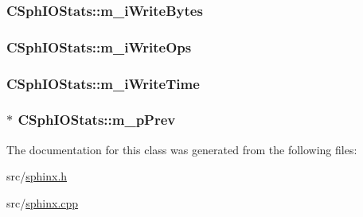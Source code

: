 \hypertarget{classCSphIOStats_a392b3667765a3b3329bb8e3673a192e1}{
\subsubsection[{m\-\_\-i\-Write\-Bytes}]{ C\-Sph\-I\-O\-Stats\-::m\-\_\-i\-Write\-Bytes}}\label{classCSphIOStats_a392b3667765a3b3329bb8e3673a192e1}
\hypertarget{classCSphIOStats_a96e6898d2120e25d31a5fe8bb86864f7}{
\subsubsection[{m\-\_\-i\-Write\-Ops}]{ C\-Sph\-I\-O\-Stats\-::m\-\_\-i\-Write\-Ops}}\label{classCSphIOStats_a96e6898d2120e25d31a5fe8bb86864f7}
\hypertarget{classCSphIOStats_a3617d74b4ad57e3310aab3b488b8482d}{
\subsubsection[{m\-\_\-i\-Write\-Time}]{ C\-Sph\-I\-O\-Stats\-::m\-\_\-i\-Write\-Time}}\label{classCSphIOStats_a3617d74b4ad57e3310aab3b488b8482d}
\hypertarget{classCSphIOStats_a32d39551051c96bf8db5d6cebd482d87}{
\subsubsection[{m\-\_\-p\-Prev}]{$\ast$ C\-Sph\-I\-O\-Stats\-::m\-\_\-p\-Prev\hspace{0.3cm}{\ttfamily [private]}}}\label{classCSphIOStats_a32d39551051c96bf8db5d6cebd482d87}


The documentation for this class was generated from the following files\-:\begin{DoxyCompactItemize}
\item 
src/\hyperlink{sphinx_8h}{sphinx.\-h}\item 
src/\hyperlink{sphinx_8cpp}{sphinx.\-cpp}\end{DoxyCompactItemize}
